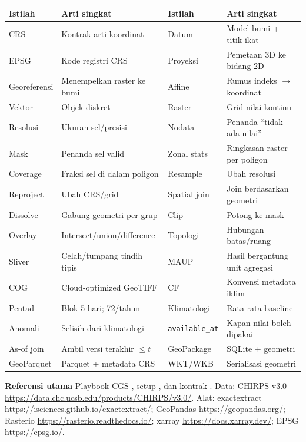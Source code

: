 \documentclass[9pt,a4paper]{extarticle}
\newcommand{\code}[1]{\texttt{\small\color{ink}#1}}
\newcommand{\thead}[1]{\textbf{\color{ink}#1}}
\begin{document}
\begin{center}
\footnotesize
\begin{tabularx}{\linewidth}{@{}>{\RaggedRight\arraybackslash}p{3.0cm}>{\RaggedRight\arraybackslash}X>{\RaggedRight\arraybackslash}p{3.0cm}>{\RaggedRight\arraybackslash}X@{}}
\toprule
\rowcolor{bg}\thead{Istilah} & \thead{Arti singkat} & \thead{Istilah} & \thead{Arti singkat}\\
\midrule
CRS & Kontrak arti koordinat & Datum & Model bumi + titik ikat\\
EPSG & Kode registri CRS & Proyeksi & Pemetaan 3D ke bidang 2D\\
Georeferensi & Menempelkan raster ke bumi & Affine & Rumus indeks $\to$ koordinat\\
Vektor & Objek diskret & Raster & Grid nilai kontinu\\
Resolusi & Ukuran sel/presisi & Nodata & Penanda ``tidak ada nilai''\\
Mask & Penanda sel valid & Zonal stats & Ringkasan raster per poligon\\
Coverage & Fraksi sel di dalam poligon & Resample & Ubah resolusi\\
Reproject & Ubah CRS/grid & Spatial join & Join berdasarkan geometri\\
Dissolve & Gabung geometri per grup & Clip & Potong ke mask\\
Overlay & Intersect/union/difference & Topologi & Hubungan batas/ruang\\
Sliver & Celah/tumpang tindih tipis & MAUP & Hasil bergantung unit agregasi\\
COG & Cloud-optimized GeoTIFF & CF & Konvensi metadata iklim\\
Pentad & Blok 5 hari; 72/tahun & Klimatologi & Rata-rata baseline\\
Anomali & Selisih dari klimatologi & \code{available\_at} & Kapan nilai boleh dipakai\\
As-of join & Ambil versi terakhir $\le t$ & GeoPackage & SQLite + geometri\\
GeoParquet & Parquet + metadata CRS & WKT/WKB & Serialisasi geometri\\
\bottomrule
\end{tabularx}
\end{center}

\vspace{1pt}
{\sffamily\bfseries\color{ink}Referensi utama}\quad
{\footnotesize
Playbook CGS , setup , dan kontrak . Data: CHIRPS v3.0 \url{https://data.chc.ucsb.edu/products/CHIRPS/v3.0/}. Alat: exactextract \url{https://isciences.github.io/exactextract/}; GeoPandas \url{https://geopandas.org/}; Rasterio \url{https://rasterio.readthedocs.io/}; xarray \url{https://docs.xarray.dev/}; EPSG \url{https://epsg.io/}.}
\end{document}
